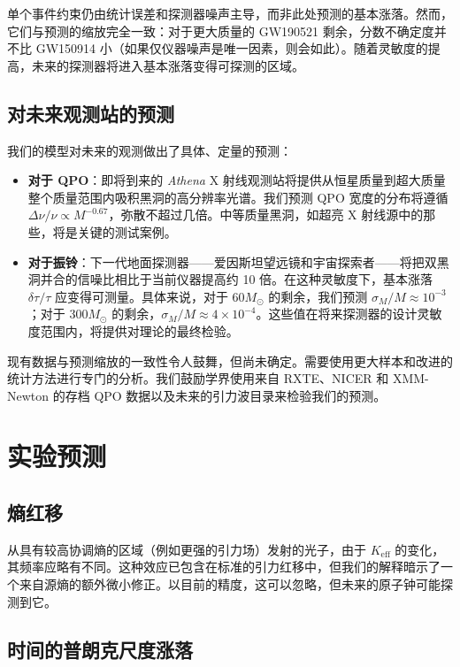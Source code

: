 \documentclass[12pt,a4paper]{article}
\newcommand{\Keff}{K_{\mathrm{eff}}}
\begin{document}
	单个事件约束仍由统计误差和探测器噪声主导，而非此处预测的基本涨落。然而，它们与预测的缩放完全一致：对于更大质量的 GW190521 剩余，分数不确定度并不比 GW150914 小（如果仅仪器噪声是唯一因素，则会如此）。随着灵敏度的提高，未来的探测器将进入基本涨落变得可探测的区域。
	
	\subsection{对未来观测站的预测}
	
	我们的模型对未来的观测做出了具体、定量的预测：
	
	\begin{itemize}
		\item \textbf{对于 QPO}：即将到来的 \textit{Athena} X 射线观测站将提供从恒星质量到超大质量整个质量范围内吸积黑洞的高分辨率光谱。我们预测 QPO 宽度的分布将遵循 \(\Delta\nu/\nu \propto M^{-0.67}\)，弥散不超过几倍。中等质量黑洞，如超亮 X 射线源中的那些，将是关键的测试案例。
		
		\item \textbf{对于振铃}：下一代地面探测器——爱因斯坦望远镜和宇宙探索者——将把双黑洞并合的信噪比相比于当前仪器提高约 10 倍。在这种灵敏度下，基本涨落 \(\delta\tau/\tau\) 应变得可测量。具体来说，对于 \(60 M_\odot\) 的剩余，我们预测 \(\sigma_M/M \approx 10^{-3}\)；对于 \(300 M_\odot\) 的剩余，\(\sigma_M/M \approx 4 \times 10^{-4}\)。这些值在将来探测器的设计灵敏度范围内，将提供对理论的最终检验。
	\end{itemize}
	
	现有数据与预测缩放的一致性令人鼓舞，但尚未确定。需要使用更大样本和改进的统计方法进行专门的分析。我们鼓励学界使用来自 RXTE、NICER 和 XMM-Newton 的存档 QPO 数据以及未来的引力波目录来检验我们的预测。
	
	\section{实验预测}
	\label{sec:predictions}
	
	\subsection{熵红移}
	
	从具有较高协调熵的区域（例如更强的引力场）发射的光子，由于 \(\Keff\) 的变化，其频率应略有不同。这种效应已包含在标准的引力红移中，但我们的解释暗示了一个来自源熵的额外微小修正。以目前的精度，这可以忽略，但未来的原子钟可能探测到它。
	
	\subsection{时间的普朗克尺度涨落}
	
\end{document}
